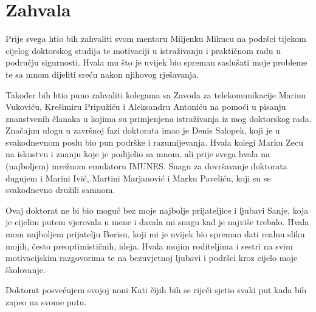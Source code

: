 \thispagestyle{empty}

\section*{Zahvala}

Prije svega htio bih zahvaliti svom mentoru Miljenku Mikucu na podršci tijekom
cijelog doktorskog studija te motivaciji u istraživanju i praktičnom radu u
području sigurnosti. Hvala mu što je uvijek bio spreman saslušati moje probleme
te sa mnom dijeliti sreću nakon njihovog rješavanja.

Također bih htio puno zahvaliti kolegama sa Zavoda za telekomunikacije Marinu
Vukoviću, Krešimiru Pripužiću i Aleksandru Antoniću na pomoći u pisanju
znanstvenih članaka u kojima su primjenjena istraživanja iz mog doktorskog rada.
Značajnu ulogu u završnoj fazi doktorata imao je Denis Salopek, koji je u
svakodnevnom poslu bio pun podrške i razumijevanja. Hvala kolegi Marku Zecu na
iskustvu i znanju koje je podijelio sa mnom, ali prije svega hvala na
(najboljem) mrežnom emulatoru IMUNES. Snagu za dovršavanje doktorata dugujem i
Marini Ivić, Martini Marjanović i Marku Paveliću, koji su se svakodnevno družili
samnom. 

Ovaj doktorat ne bi bio moguć bez moje najbolje prijateljice i ljubavi Sanje,
koja je cijelim putem vjerovala u mene i davala mi snagu kad je najviše trebalo.
Hvala mom najboljem prijatelju Borisu, koji mi je uvijek bio spreman dati realnu
sliku mojih, često preoptimističnih, ideja. Hvala mojim roditeljima i sestri na
svim motivacijskim razgovorima te na bezuvjetnoj ljubavi i podršci kroz cijelo
moje školovanje.

Doktorat posvećujem svojoj noni Kati čijih bih se riječi sjetio svaki put kada
bih zapeo na svome putu.

